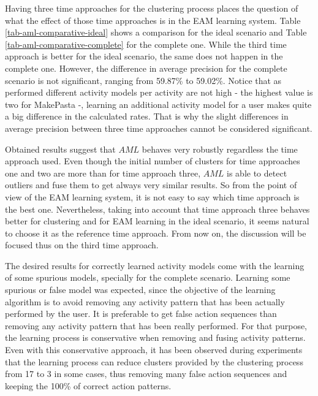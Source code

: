 Having three time approaches for the clustering process places the question of what the effect of those time approaches is in the EAM learning system. Table \ref{tab-aml-comparative-ideal} shows a comparison for the ideal scenario and Table \ref{tab-aml-comparative-complete} for the complete one. While the third time approach is better for the ideal scenario, the same does not happen in the complete one. However, the difference in average precision for the complete scenario is not significant, ranging from 59.87\% to 59.02\%. Notice that as performed different activity models per activity are not high - the highest value is two for MakePasta -, learning an additional activity model for a user makes quite a big difference in the calculated rates. That is why the slight differences in average precision between three time approaches cannot be considered significant. %

Obtained results suggest that $AML$ behaves very robustly regardless the time approach used. Even though the initial number of clusters for time approaches one and two are more than for time approach three, $AML$ is able to detect outliers and fuse them to get always very similar results. So from the point of view of the EAM learning system, it is not easy to say which time approach is the best one. Nevertheless, taking into account that time approach three behaves better for clustering and for EAM learning in the ideal scenario, it seems natural to choose it as the reference time approach. From now on, the discussion will be focused thus on the third time approach.

The desired results for correctly learned activity models come with the learning of some spurious models, specially for the complete scenario. Learning some spurious or false model was expected, since the objective of the learning algorithm is to avoid removing any activity pattern that has been actually performed by the user. It is preferable to get false action sequences than removing any activity pattern that has been really performed. For that purpose, the learning process is conservative when removing and fusing activity patterns. Even with this conservative approach, it has been observed during experiments that the learning process can reduce clusters provided by the clustering process from 17 to 3 in some cases, thus removing many false action sequences and keeping the 100\% of correct action patterns.

